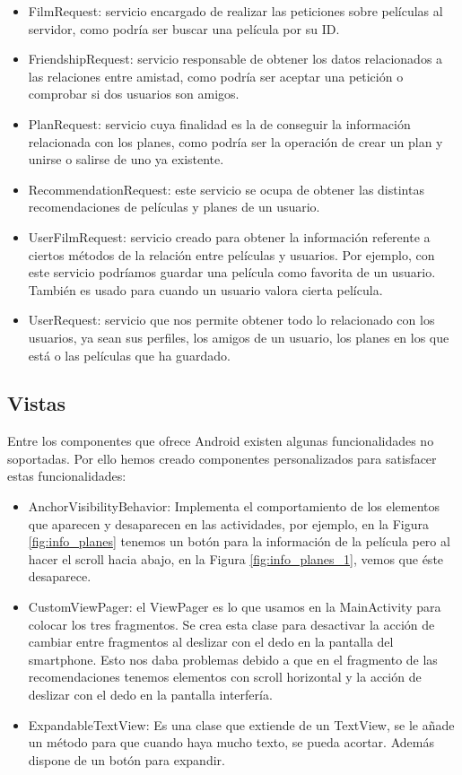 \begin{itemize}
    \item FilmRequest: servicio encargado de realizar las peticiones sobre películas al servidor, como podría ser buscar una película por su ID.
    \item FriendshipRequest: servicio responsable de obtener los datos relacionados a las relaciones entre amistad, como podría ser aceptar una petición o comprobar si dos usuarios son amigos.
    \item PlanRequest: servicio cuya finalidad es la de conseguir la información relacionada con los planes, como podría ser la operación de crear un plan y unirse o salirse de uno ya existente.
    \item RecommendationRequest: este servicio se ocupa de obtener las distintas recomendaciones de películas y planes de un usuario.
    \item UserFilmRequest: servicio creado para obtener la información referente a ciertos métodos de la relación entre películas y usuarios. Por ejemplo, con este servicio podríamos guardar una película como favorita de un usuario. También es usado para cuando un usuario valora cierta película.
    \item UserRequest: servicio que nos permite obtener todo lo relacionado con los usuarios, ya sean sus perfiles, los amigos de un usuario, los planes en los que está o las películas que ha guardado.
\end{itemize}

\subsection{Vistas}
\label{makereference4.4.7}
Entre los componentes que ofrece Android existen algunas funcionalidades no soportadas. Por ello hemos creado componentes personalizados para satisfacer estas funcionalidades:
\begin{itemize}
    \item AnchorVisibilityBehavior: Implementa el comportamiento de los elementos que aparecen y desaparecen en las actividades, por ejemplo, en la Figura \ref{fig:info_planes} tenemos un botón para la información de la película pero al hacer el scroll hacia abajo, en la Figura \ref{fig:info_planes_1}, vemos que éste desaparece.
    \item CustomViewPager: el ViewPager es lo que usamos en la MainActivity para colocar los tres fragmentos. Se crea esta clase para desactivar la acción de cambiar entre fragmentos al deslizar con el dedo en la pantalla del smartphone. Esto nos daba problemas debido a que en el fragmento de las recomendaciones tenemos elementos con scroll horizontal y la acción de deslizar con el dedo en la pantalla interfería.
    \item ExpandableTextView: Es una clase que extiende de un TextView, se le añade un método para que cuando haya mucho texto, se pueda acortar. Además dispone de un botón para expandir.
\end{itemize} 
